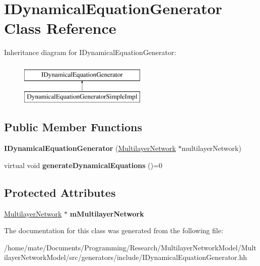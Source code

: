 \hypertarget{classIDynamicalEquationGenerator}{}\section{I\+Dynamical\+Equation\+Generator Class Reference}
\label{classIDynamicalEquationGenerator}
Inheritance diagram for I\+Dynamical\+Equation\+Generator\+:\begin{figure}[H]
\begin{center}
\leavevmode
\includegraphics[height=2.000000cm]{classIDynamicalEquationGenerator}
\end{center}
\end{figure}
\subsection*{Public Member Functions}
\begin{DoxyCompactItemize}
\item 
{\bfseries I\+Dynamical\+Equation\+Generator} (\hyperlink{classMultilayerNetwork}{Multilayer\+Network} $\ast$multilayer\+Network)\hypertarget{classIDynamicalEquationGenerator_a7c4ee27a9153c6c71c56363509e9db50}{}\label{classIDynamicalEquationGenerator_a7c4ee27a9153c6c71c56363509e9db50}

\item 
virtual void {\bfseries generate\+Dynamical\+Equations} ()=0\hypertarget{classIDynamicalEquationGenerator_a23867fb164b2e17a98f2acde2f6d658e}{}\label{classIDynamicalEquationGenerator_a23867fb164b2e17a98f2acde2f6d658e}

\end{DoxyCompactItemize}
\subsection*{Protected Attributes}
\begin{DoxyCompactItemize}
\item 
\hyperlink{classMultilayerNetwork}{Multilayer\+Network} $\ast$ {\bfseries m\+Multilayer\+Network}\hypertarget{classIDynamicalEquationGenerator_aa20ebd4982dc045c28dba4e0fb63c585}{}\label{classIDynamicalEquationGenerator_aa20ebd4982dc045c28dba4e0fb63c585}

\end{DoxyCompactItemize}


The documentation for this class was generated from the following file\+:\begin{DoxyCompactItemize}
\item 
/home/mate/\+Documents/\+Programming/\+Research/\+Multilayer\+Network\+Model/\+Multilayer\+Network\+Model/src/generators/include/I\+Dynamical\+Equation\+Generator.\+hh\end{DoxyCompactItemize}
